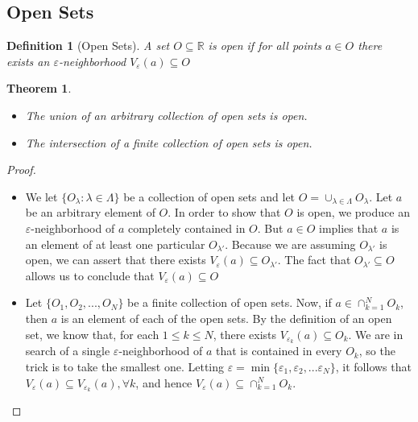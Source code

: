 \documentclass[10pt]{report}
\newtheorem{thm3}{Theorem}[subsection]
\newtheorem{def3}{Definition}[subsection]
\newcommand{\eps}{\varepsilon}
\begin{document}
\subsection{Open Sets}
\begin{def3}[Open Sets]
A set $O\subseteq \mathbb{R}$ is open if for all points $a\in O$ there exists an $\eps$-neighborhood $V_\eps (a)\subseteq O$ 
\end{def3}
\begin{thm3}
\begin{itemize}
\item[(i)] The union of an arbitrary collection of open sets is open.
\item[(ii)] The intersection of a finite collection of open sets is open.
\end{itemize}
\end{thm3}
\begin{proof}
\begin{itemize}
\item[(i)] We let $\{O_\lambda:\lambda\in \Lambda\}$ be a collection of open sets and let $O = \cup_{\lambda\in\Lambda}O_\lambda$. Let $a$ be an arbitrary element of $O$. In order to show that $O$ is open, we produce an $\eps$-neighborhood of $a$ completely contained in $O$. But $a\in O$ implies that $a$ is an element of at least one particular $O_{\lambda'}$. Because we are assuming $O_{\lambda'}$ is open, we can assert that there exists $V_\eps(a)\subseteq O_{\lambda'}$. The fact that $O_{\lambda'}\subseteq O$ allows us to conclude that $V_\eps(a)\subseteq O$
\item[(ii)] Let $\{O_1, O_2, ...,O_N\}$ be a finite collection of open sets. Now, if $a\in\cap_{k=1}^N O_k$, then $a$ is an element of each of the open sets. By the definition of an open set, we know that, for each $1\leq k\leq N$, there exists $V_{\eps_k}(a)\subseteq O_k$. We are in search of a single $\eps$-neighborhood of $a$ that is contained in every $O_k$, so the trick is to take the smallest one. Letting $\eps=\min\{\eps_1,\eps_2,...\eps_N\}$, it follows that $V_\eps(a)\subseteq V_{\eps_k}(a),\forall k$, and hence $V_\eps(a)\subseteq\cap_{k=1}^N O_k$.
\end{itemize}
\end{proof}
\end{document}
